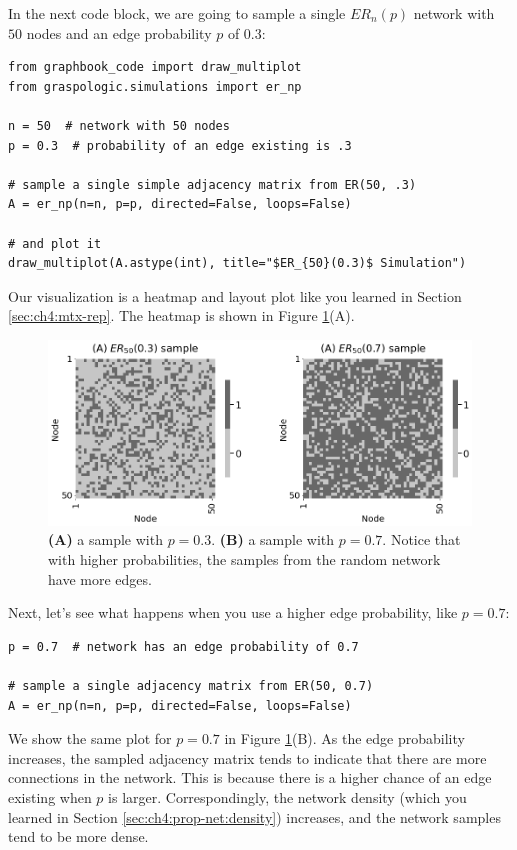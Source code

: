 In the next code block, we are going to sample a single $ER_n(p)$ network with $50$ nodes and an edge probability $p$ of $0.3$:


\begin{lstlisting}[style=python]
from graphbook_code import draw_multiplot
from graspologic.simulations import er_np

n = 50  # network with 50 nodes
p = 0.3  # probability of an edge existing is .3

# sample a single simple adjacency matrix from ER(50, .3)
A = er_np(n=n, p=p, directed=False, loops=False)

# and plot it
draw_multiplot(A.astype(int), title="$ER_{50}(0.3)$ Simulation")
\end{lstlisting}
Our visualization is a heatmap and layout plot like you learned in Section \ref{sec:ch4:mtx-rep}. The heatmap is shown in Figure \ref{fig:ch5:er}(A).

\begin{figure}
    \centering
    \includegraphics[width=\linewidth]{representations/ch5/Images/er.png}
    \caption[A sample from an $ER_n(p)$ network.]{\textbf{(A)} a sample with $p=0.3$. \textbf{(B)} a sample with $p=0.7$. Notice that with higher probabilities, the samples from the random network have more edges.}
    \label{fig:ch5:er}
\end{figure}

Next, let's see what happens when you use a higher edge probability, like $p=0.7$:

\begin{lstlisting}[style=python]
p = 0.7  # network has an edge probability of 0.7

# sample a single adjacency matrix from ER(50, 0.7)
A = er_np(n=n, p=p, directed=False, loops=False)
\end{lstlisting}

We show the same plot for $p=0.7$ in Figure \ref{fig:ch5:er}(B). As the edge probability increases, the sampled adjacency matrix tends to indicate that there are more connections in the network. This is because there is a higher chance of an edge existing when $p$ is larger. Correspondingly, the network density (which you learned in Section \ref{sec:ch4:prop-net:density}) increases, and the network samples tend to be more dense.

